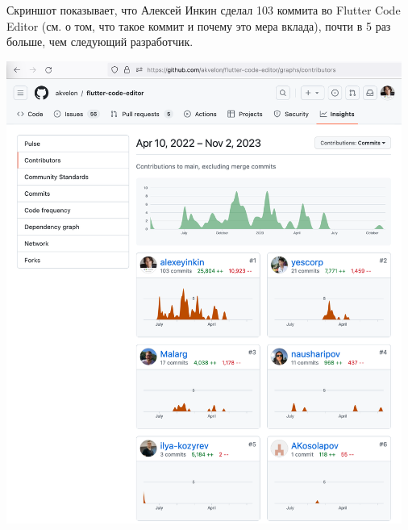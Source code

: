 
Скриншот показывает, что Алексей Инкин сделал 103 коммита во Flutter Code Editor
(см.  о том, что такое коммит и почему это мера вклада),
почти в 5 раз больше, чем следующий разработчик.

\begin{center}
    \includegraphics[width=35em]{github-contributors}
\end{center}

\pagebreak
